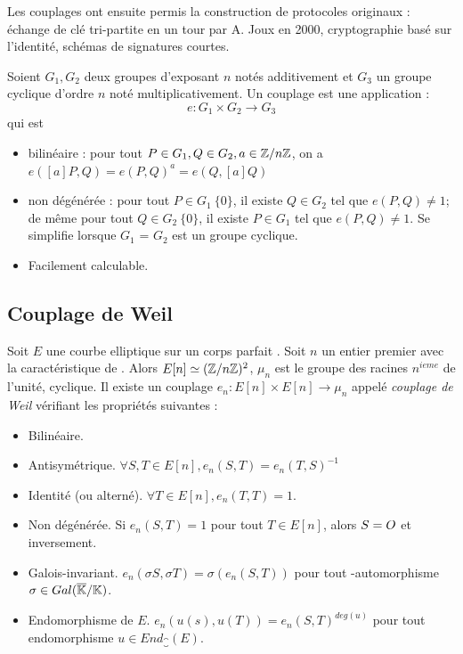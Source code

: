 Les couplages ont ensuite permis la construction de protocoles originaux : échange de clé tri-partite en un tour par A. Joux en 2000, cryptographie basé sur l'identité, schémas de signatures courtes.

\begin{definition}
Soient $G_1, G_2$ deux groupes d'exposant $n$ notés additivement et $G_3$ un groupe cyclique d'ordre $n$ noté multiplicativement. Un couplage est une application : 
$$e \colon G_1 \times G_2 \to G_3$$
qui est 
\begin{itemize}[label=--]
    \item bilinéaire : pour tout $P \in G_1, Q \in G_2, a \in \mathbb{Z}/n\mathbb{Z}$, on a $e([a]P, Q) = e(P, Q)^{a} = e(Q, [a]Q)$
    \item non dégénérée : pour tout $P \in G_1 \ \{ 0 \}$, il existe $Q \in G_2$ tel que $e(P, Q) \neq 1$; de même pour tout $Q \in G_2 \ \{ 0 \}$, il existe $P \in G_1$ tel que $e(P, Q) \neq 1$. Se simplifie lorsque $G_1$ = $G_2$ est un groupe cyclique. 
    \item Facilement calculable.
\end{itemize}
\end{definition}


\subsection{Couplage de Weil}
\begin{theoreme}
Soit $E$ une courbe elliptique sur un corps parfait \field{}. Soit $n$ un entier premier avec la caractéristique de \field{}. Alors $E[n] \simeq (\mathbb{Z}/n\mathbb{Z})^2$, $\mu_n$ est le groupe des racines $n^{ieme}$ de l'unité, cyclique.
Il existe un couplage $e_n \colon E[n] \times E[n] \to \mu_n$ appelé \emph{couplage de Weil} vérifiant les propriétés suivantes :
\begin{itemize}[label=--]
    \item Bilinéaire.
    \item Antisymétrique. $\forall S, T \in E[n], e_n(S, T) = e_n(T, S)^{-1}$
    \item Identité (ou alterné). $\forall T \in E[n], e_n(T, T) = 1$.
    \item Non dégénérée. Si $e_n(S, T) = 1$ pour tout $T \in E[n]$, alors $S = O{}$ et inversement.
    \item Galois-invariant. $e_n(\sigma S, \sigma T) = \sigma (e_n(S, T))$ pour tout \field{}-automorphisme $\sigma \in Gal(\overline{\mathbb{K}}{}/\mathbb{K}{})$.
    \item Endomorphisme de $E$. $e_n(u(s), u(T)) = e_n(S, T)^{deg(u)}$ pour tout endomorphisme $u \in End_{\closure{}}(E)$.
\end{itemize}
\end{theoreme}


